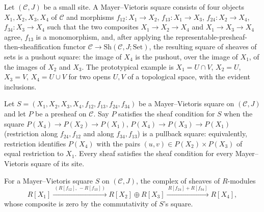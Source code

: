 \begin{definition}
  \label{pa-def:MayerVietorisSquare}
  \mathlibok

  Let \((\mathcal C, J)\) be a small site. A Mayer--Vietoris square consists of four objects
  \(X_1, X_2, X_3, X_4\) of \(\mathcal C\) and morphisms \(f_{12} : X_1 \to X_2\),
  \(f_{13} : X_1 \to X_3\), \(f_{24} : X_2 \to X_4\), \(f_{34} : X_3 \to X_4\) such that the
  two composites \(X_1 \to X_2 \to X_4\) and \(X_1 \to X_3 \to X_4\) agree, \(f_{13}\) is a
  monomorphism, and, after applying the representable-presheaf-then-sheafification functor
  \(\mathcal C \to \mathrm{Sh}(\mathcal C, J; \mathrm{Set})\), the resulting square of
  sheaves of sets is a pushout square: the image of \(X_4\) is the pushout, over the image of
  \(X_1\), of the images of \(X_2\) and \(X_3\). The prototypical example is
  \(X_1 = U \cap V\), \(X_2 = U\), \(X_3 = V\), \(X_4 = U \cup V\) for two opens \(U, V\) of a
  topological space, with the evident inclusions.
\end{definition}

\begin{definition}
  \label{pa-def:mv_sheaf_condition}
  \mathlibok

  Let \(S = (X_1,X_2,X_3,X_4,f_{12},f_{13},f_{24},f_{34})\) be a Mayer--Vietoris square on
  \((\mathcal C, J)\) and let \(P\) be a presheaf on \(\mathcal C\). Say \(P\) satisfies the
  sheaf condition for \(S\) when the square \(P(X_4) \to P(X_2) \to P(X_1)\),
  \(P(X_4) \to P(X_3) \to P(X_1)\) (restriction along \(f_{24}, f_{12}\) and along
  \(f_{34}, f_{13}\)) is a pullback square: equivalently, restriction identifies \(P(X_4)\)
  with the pairs \((u,v) \in P(X_2) \times P(X_3)\) of equal restriction to \(X_1\). Every
  sheaf satisfies the sheaf condition for every Mayer--Vietoris square of its site.
\end{definition}

\begin{definition}
  \label{pa-def:moduleShortComplex}
  \leanok

  For a Mayer--Vietoris square \(S\) on \((\mathcal C, J)\), the complex of sheaves of
  \(R\)-modules
  \[
    R[X_1] \xrightarrow{\ (R[f_{12}],\, -R[f_{13}])\ } R[X_2] \oplus R[X_3]
      \xrightarrow{\ R[f_{24}] + R[f_{34}]\ } R[X_4],
  \]
  whose composite is zero by the commutativity of \(S\)'s square.
\end{definition}

